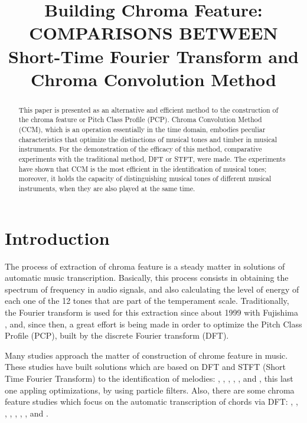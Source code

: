 \documentclass{article}
\title{Building Chroma Feature: COMPARISONS BETWEEN Short-Time Fourier Transform and Chroma Convolution Method}
\begin{document}
%
\maketitle
%
\begin{abstract}

This paper is presented as an alternative and efficient method to the construction of the chroma feature or Pitch Class Profile (PCP). Chroma Convolution Method (CCM), which is an operation essentially in the time domain, embodies peculiar characteristics that optimize the distinctions of musical tones and timber in musical instruments. For the demonstration of the efficacy of this method, comparative experiments with the traditional method, DFT or STFT,  were made. The experiments have shown that CCM is the most efficient in the identification of musical tones; moreover, it holds the capacity of distinguishing musical tones of different musical instruments, when they are also played at the same time.
\end{abstract}
%
\section{Introduction}\label{sec:introduction}


	The process of extraction of chroma feature is a steady matter in solutions of automatic music transcription. Basically, this process consists in obtaining the spectrum of frequency in audio signals, and also calculating the level of energy of each one of the 12 tones that are part of the temperament scale. Traditionally, the Fourier transform is used for this extraction since about 1999 with Fujishima \cite{fujishima1999realtime}, and, since then, a great effort is being made in order to optimize the Pitch Class Profile (PCP), built by the discrete Fourier transform (DFT).

	Many studies approach the matter of construction of chrome feature in music. These studies have built solutions which are based on DFT and STFT (Short Time Fourier Transform) to the identification of melodies: \cite{muto2002transcription}, \cite{al2008time}, \cite{barbancho2009transcription}, \cite{gomez2004automatic}, \cite{tangmelody}, \cite{eggink2004extracting} and \cite{jo2010melody}, this last one appling optimizations, by using particle filters. Also, there are some chroma feature studies which focus on the automatic transcription of chords via DFT:
	\cite{harte2009automatic}, \cite{khadkevich2011time}, \cite{harte2010towards}, \cite{peeters2006chroma}, \cite{cho2010exploring} \cite{lee2006automatic}, \cite{de2012improving}, \cite{boulanger2013audio}, \cite{chen2012chord} and \cite{hrybyk2010combined}.
\end{document}
